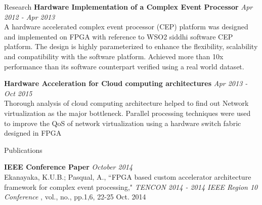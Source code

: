 \documentclass[
11pt, %
]{./../assets/resume} %
\begin{document}
\begin{rSection}{Research}
	\textbf{Hardware Implementation of a Complex Event Processor} \hfill \textit{Apr 2012 - Apr 2013}\\
	A hardware accelerated complex event processor (CEP) platform was designed and implemented on FPGA with reference to WSO2 siddhi software CEP platform.
	The design is highly parameterized to enhance the flexibility, scalability and compatibility with the software platform.
	Achieved more than 10x performance than its software counterpart verified using a real world dataset.

	
	\textbf{Hardware Acceleration for Cloud computing architectures} \hfill \textit{Apr 2013 - Oct 2015}\\
	Thorough analysis of cloud computing architecture helped to find out Network virtualization as the major bottleneck.
	Parallel processing techniques were used to improve the QoS of network virtualization using a hardware switch fabric designed in FPGA

	
\end{rSection}

\begin{rSection}{Publications}

	\textbf{IEEE Conference Paper } \hfill  \textit{October 2014}\\
	Ekanayaka, K.U.B.; Pasqual, A., ``FPGA based custom accelerator architecture framework for complex event processing," \emph{TENCON 2014 - 2014 IEEE Region 10 Conference} , vol., no., pp.1,6, 22-25 Oct. 2014

\end{rSection}
 
\end{document}
